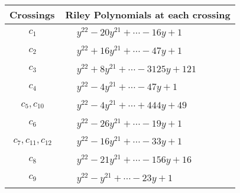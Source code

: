 \documentclass[1p]{elsarticle_modified}
\theoremstyle{definition}
\begin{document}
\begin{tabular}{m{50pt}|m{274pt}}
Crossings & \hspace{64pt}Riley Polynomials at each crossing \\
\hline $$\begin{aligned}c_{1}\end{aligned}$$&$\begin{aligned}
&y^{22}-20 y^{21}+\cdots-16 y+1
\end{aligned}$\\
\hline $$\begin{aligned}c_{2}\end{aligned}$$&$\begin{aligned}
&y^{22}+16 y^{21}+\cdots-47 y+1
\end{aligned}$\\
\hline $$\begin{aligned}c_{3}\end{aligned}$$&$\begin{aligned}
&y^{22}+8 y^{21}+\cdots-3125 y+121
\end{aligned}$\\
\hline $$\begin{aligned}c_{4}\end{aligned}$$&$\begin{aligned}
&y^{22}-4 y^{21}+\cdots-47 y+1
\end{aligned}$\\
\hline $$\begin{aligned}c_{5},c_{10}\end{aligned}$$&$\begin{aligned}
&y^{22}-4 y^{21}+\cdots+444 y+49
\end{aligned}$\\
\hline $$\begin{aligned}c_{6}\end{aligned}$$&$\begin{aligned}
&y^{22}-26 y^{21}+\cdots-19 y+1
\end{aligned}$\\
\hline $$\begin{aligned}c_{7},c_{11},c_{12}\end{aligned}$$&$\begin{aligned}
&y^{22}-16 y^{21}+\cdots-33 y+1
\end{aligned}$\\
\hline $$\begin{aligned}c_{8}\end{aligned}$$&$\begin{aligned}
&y^{22}-21 y^{21}+\cdots-156 y+16
\end{aligned}$\\
\hline $$\begin{aligned}c_{9}\end{aligned}$$&$\begin{aligned}
&y^{22}- y^{21}+\cdots-23 y+1
\end{aligned}$\\
\hline
\end{tabular}\\~\\
\end{document}
